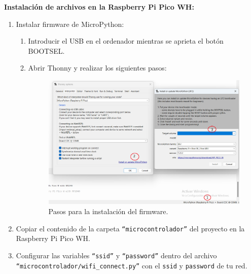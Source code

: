 \documentclass{article}
\begin{document}
\textbf{Instalación de archivos en la Raspberry Pi Pico WH:}
\begin{enumerate}
	\item Instalar firmware de MicroPython:
		\begin{enumerate}
			\item Introducir el USB en el ordenador mientras se aprieta el botón BOOTSEL.
			\item Abrir Thonny y realizar los siguientes pasos:
			\begin{figure}[H]
			\centering
			\includegraphics[width=0.8\linewidth]{../images/instalacion_firmware.png}
			\caption{\label{fig:instalación firmware}Pasos para la instalación del firmware.}
			\end{figure}
		\end{enumerate}
			\item Copiar el contenido de la carpeta \texttt{``microcontrolador''} del proyecto en la Raspberry Pi Pico WH.
			\item Configurar las variables \texttt{``ssid''} y \texttt{``password''} dentro del archivo \texttt{``microcontrolador/wifi\_connect.py''} con el \texttt{ssid} y \texttt{password} de tu red.
\end{enumerate}
\end{document}

